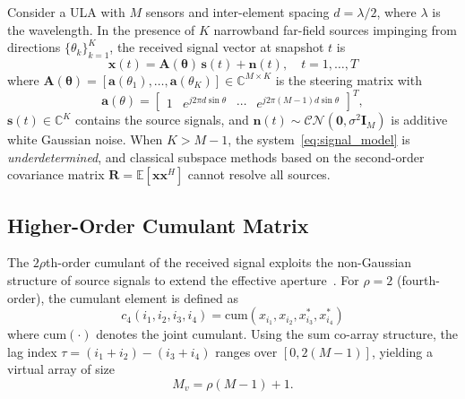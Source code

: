 \documentclass[journal]{IEEEtran}
\newcommand{\vect}[1]{\boldsymbol{#1}}
\newcommand{\mat}[1]{\mathbf{#1}}
\newcommand{\E}{\mathbb{E}}
\newcommand{\C}{\mathbb{C}}
\begin{document}
Consider a ULA with $M$ sensors and inter-element spacing $d = \lambda/2$, where $\lambda$ is the wavelength. In the presence of $K$ narrowband far-field sources impinging from directions $\{\theta_k\}_{k=1}^K$, the received signal vector at snapshot $t$ is
\begin{equation}
\mat{x}(t) = \mat{A}(\vect{\theta})\,\mat{s}(t) + \mat{n}(t), \quad t = 1, \ldots, T
\label{eq:signal_model}
\end{equation}
where $\mat{A}(\vect{\theta}) = [\mat{a}(\theta_1), \ldots, \mat{a}(\theta_K)] \in \C^{M \times K}$ is the steering matrix with
\begin{equation}
\mat{a}(\theta) = \begin{bmatrix} 1 & e^{j2\pi d\sin\theta} & \cdots & e^{j2\pi(M-1)d\sin\theta} \end{bmatrix}^T,
\end{equation}
$\mat{s}(t) \in \C^K$ contains the source signals, and $\mat{n}(t) \sim \mathcal{CN}(\mat{0}, \sigma^2\mat{I}_M)$ is additive white Gaussian noise. When $K > M-1$, the system~\eqref{eq:signal_model} is \emph{underdetermined}, and classical subspace methods based on the second-order covariance matrix $\mat{R} = \E[\mat{x}\mat{x}^H]$ cannot resolve all sources.

\subsection{Higher-Order Cumulant Matrix}

The $2\rho$th-order cumulant of the received signal exploits the non-Gaussian structure of source signals to extend the effective aperture~\cite{choi2015underdetermined,dogan1995cumulant}. For $\rho = 2$ (fourth-order), the cumulant element is defined as
\begin{equation}
c_4(i_1, i_2, i_3, i_4) = \mathrm{cum}(x_{i_1}, x_{i_2}, x^*_{i_3}, x^*_{i_4})
\end{equation}
where $\mathrm{cum}(\cdot)$ denotes the joint cumulant. Using the sum co-array structure, the lag index $\tau = (i_1 + i_2) - (i_3 + i_4)$ ranges over $[0, 2(M-1)]$, yielding a virtual array of size
\begin{equation}
M_v = \rho(M-1) + 1.
\label{eq:virtual_array}
\end{equation}
\end{document}
